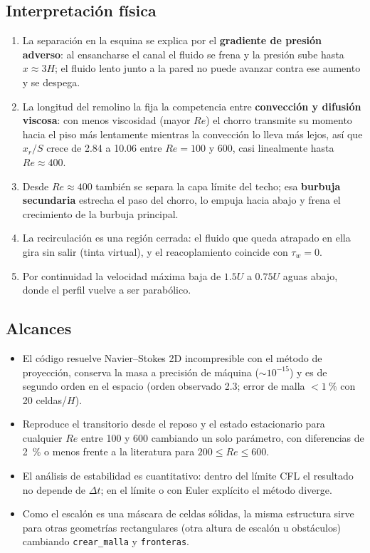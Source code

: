 \documentclass[11pt,letterpaper]{article}
\newcommand{\Rey}{\mathit{Re}}
\begin{document}
\subsection{Interpretación física}
\begin{enumerate}
  \item La separación en la esquina se explica por el \textbf{gradiente de presión adverso}: al ensancharse el canal el
    fluido se frena y la presión sube hasta $x\approx3H$; el fluido lento junto a la pared no puede avanzar contra ese
    aumento y se despega.
  \item La longitud del remolino la fija la competencia entre \textbf{convección y difusión viscosa}: con menos viscosidad
    (mayor $\Rey$) el chorro transmite su momento hacia el piso más lentamente mientras la convección lo lleva más lejos,
    así que $x_r/S$ crece de 2.84 a 10.06 entre $\Rey=100$ y 600, casi linealmente hasta $\Rey\approx400$.
  \item Desde $\Rey\approx400$ también se separa la capa límite del techo; esa \textbf{burbuja secundaria} estrecha el paso
    del chorro, lo empuja hacia abajo y frena el crecimiento de la burbuja principal.
  \item La recirculación es una región cerrada: el fluido que queda atrapado en ella gira sin salir (tinta virtual), y el
    reacoplamiento coincide con $\tau_w=0$.
  \item Por continuidad la velocidad máxima baja de $1.5U$ a $0.75U$ aguas abajo, donde el perfil vuelve a ser parabólico.
\end{enumerate}

\subsection{Alcances}
\begin{itemize}
  \item El código resuelve Navier–Stokes 2D incompresible con el método de proyección, conserva la masa a precisión de
    máquina ($\sim10^{-15}$) y es de segundo orden en el espacio (orden observado 2.3; error de malla $<\SI{1}{\percent}$
    con 20 celdas/$H$).
  \item Reproduce el transitorio desde el reposo y el estado estacionario para cualquier $\Rey$ entre 100 y 600 cambiando un
    solo parámetro, con diferencias de \SI{2}{\percent} o menos frente a la literatura para $200\le\Rey\le600$.
  \item El análisis de estabilidad es cuantitativo: dentro del límite CFL el resultado no depende de $\Delta t$; en el límite
    o con Euler explícito el método diverge.
  \item Como el escalón es una máscara de celdas sólidas, la misma estructura sirve para otras geometrías rectangulares
    (otra altura de escalón u obstáculos) cambiando \texttt{crear\_malla} y \texttt{fronteras}.
\end{itemize}
\end{document}
